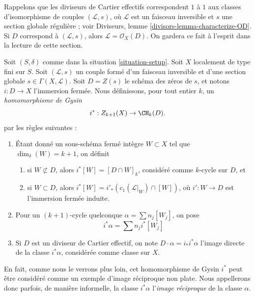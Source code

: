 \medskip\noindent
Rappelons que les diviseurs de Cartier effectifs correspondent $1$ à $1$ aux
classes d'isomorphisme de couples $(\mathcal{L}, s)$, où $\mathcal{L}$
est un faisceau inversible et $s$ une section globale régulière ; voir
Diviseurs, lemme \ref{divisors-lemma-characterize-OD}.
Si $D$ correspond à $(\mathcal{L}, s)$, alors
$\mathcal{L} = \mathcal{O}_X(D)$. On gardera ce fait à l'esprit
dans la lecture de cette section.

\begin{definition}
\label{definition-gysin-homomorphism}
Soit $(S, \delta)$ comme dans la situation \ref{situation-setup}.
Soit $X$ localement de type fini sur $S$.
Soit $(\mathcal{L}, s)$ un couple formé d'un faisceau
inversible et d'une section globale $s \in \Gamma(X, \mathcal{L})$.
Soit $D = Z(s)$ le schéma des zéros de $s$, et
notons $i : D \to X$ l'immersion fermée.
Nous définissons, pour tout entier $k$, un {\it homomorphisme de Gysin}
$$
i^* : Z_{k + 1}(X) \to \CH_k(D).
$$
par les règles suivantes :
\begin{enumerate}
\item Étant donné un sous-schéma fermé intègre $W \subset X$ tel que
$\dim_\delta(W) = k + 1$, on définit
\begin{enumerate}
\item si $W \not \subset D$, alors $i^*[W] = [D \cap W]_k$, considéré comme
$k$-cycle sur $D$, et
\item si $W \subset D$, alors
$i^*[W] = i'_*(c_1(\mathcal{L}|_W) \cap [W])$,
où $i' : W \to D$ est l'immersion fermée induite.
\end{enumerate}
\item Pour un $(k + 1)$-cycle quelconque $\alpha = \sum n_j[W_j]$,
on pose
$$
i^*\alpha = \sum n_j i^*[W_j]
$$
\item Si $D$ est un diviseur de Cartier effectif, on note
$D \cdot \alpha = i_*i^*\alpha$ l'image directe de la classe $i^*\alpha$,
considérée comme classe sur $X$.
\end{enumerate}
\end{definition}

\noindent
En fait, comme nous le verrons plus loin, cet homomorphisme de Gysin $i^*$ peut être considéré
comme un exemple d'image réciproque non plate. Nous appellerons donc parfois, de manière informelle,
la classe $i^*\alpha$ l'{\it image réciproque} de la classe $\alpha$.

